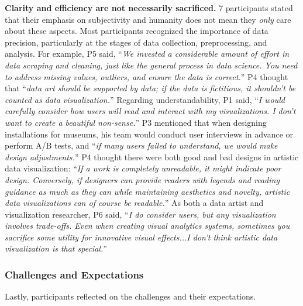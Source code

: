 \textbf{Clarity and efficiency are not necessarily sacrificed.}
7 participants stated that their emphasis on subjectivity and humanity does not mean they \textit{only} care about these aspects. Most participants recognized the importance of data precision, particularly at the stages of data collection, preprocessing, and analysis. For example, P5 said, ``\textit{We invested a considerable amount of effort in data scraping and cleaning, just like the general process in data science. You need to address missing values, outliers, and ensure the data is correct.}'' P4 thought that ``\textit{data art should be supported by data; if the data is fictitious, it shouldn't be counted as data visualization.}'' 
Regarding understandability, P1 said, ``\textit{I would carefully consider how users will read and interact with my visualizations. I don't want to create a beautiful non-sense.}''
P3 mentioned that when designing installations for museums, his team would conduct user interviews in advance or perform A/B tests, and ``\textit{if many users failed to understand, we would make design adjustments.}''
P4 thought there were both good and bad designs in artistic data visualization: ``\textit{If a work is completely unreadable, it might indicate poor design. Conversely, if designers can provide readers with legends and reading guidance as much as they can while maintaining aesthetics and novelty, artistic data visualizations can of course be readable.}''
As both a data artist and visualization researcher, P6 said, ``\textit{I do consider users, but any visualization involves trade-offs. Even when creating visual analytics systems, sometimes you sacrifice some utility for innovative visual effects...I don't think artistic data visualization is that special.}''



\subsubsection{Challenges and Expectations}
\label{sssec:expectations}
Lastly, participants reflected on the challenges and their expectations.

